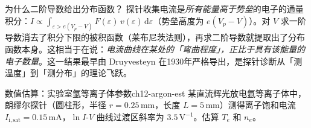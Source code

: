 \documentclass[12pt,a4paper,openany,oneside]{book}
\newcommand{\diffmarktext}[1]{%
  \textcolor{coverMid!80}{\rule[-0.1em]{2pt}{0.9em}}\,%
  \textcolor{coverMid}{\footnotesize\textbf{[#1]}}%
}
\newcommand{\difficulty}[1]{\marginnote{\raggedright\diffmarktext{#1}}}
\newcommand{\diff}{\mathrm{d}}
\newcommand{\eps}{\varepsilon}
\begin{document}
\begin{insight}{为什么二阶导数给出分布函数？}{}
探针收集电流是\emph{所有能量高于势垒}的电子的通量积分：$I \propto \int_{\eps > e(V_p - V)} F(\eps)\, v(\eps) \,\diff\eps$（势垒高度为 $e(V_p - V)$）。对 $V$ 求一阶导数消去了积分下限的被积函数（莱布尼茨法则），再求二阶导数就提取出了分布函数本身。这相当于在说：\emph{电流曲线在某处的「弯曲程度」，正比于具有该能量的电子数量}。这一结果最早由 Druyvesteyn 在1930年严格导出，是探针诊断从「测温度」到「测分布」的理论飞跃。
\end{insight}

\begin{example}{数值估算：实验室氩等离子体参数}{ch12-argon-est}
\difficulty{基础}
某直流辉光放电氩等离子体中，朗缪尔探针（圆柱形，半径 $r = 0.25\,\mathrm{mm}$，长度 $L = 5\,\mathrm{mm}$）测得离子饱和电流 $I_{\mathrm{i,sat}} = 0.15\,\mathrm{mA}$，$\ln I$-$V$ 曲线过渡区斜率为 $3.5\,\mathrm{V}^{-1}$。估算 $T_e$ 和 $n_e$。


\end{example}
\end{document}
